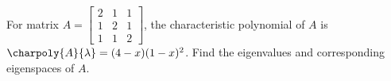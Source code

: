 For matrix 
$A = \begin{bmatrix} 
2 & 1 & 1\\
1 & 2 & 1\\
1 & 1 & 2 
\end{bmatrix}$, the characteristic polynomial of $A$ is $\charpoly{A}{\lambda} = (4-x)(1-x)^2$.  
Find the eigenvalues and corresponding eigenspaces of $A$.